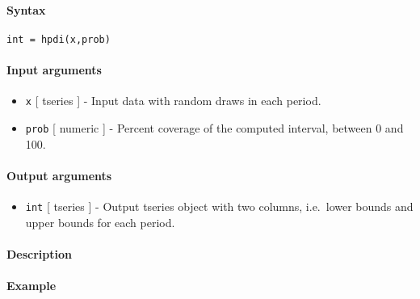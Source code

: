 


	\paragraph{Syntax}

\begin{verbatim}
int = hpdi(x,prob)
\end{verbatim}

\paragraph{Input arguments}

\begin{itemize}
\item
  \texttt{x} {[} tseries {]} - Input data with random draws in each
  period.
\item
  \texttt{prob} {[} numeric {]} - Percent coverage of the computed
  interval, between 0 and 100.
\end{itemize}

\paragraph{Output arguments}

\begin{itemize}
\itemsep1pt\parskip0pt
\item
  \texttt{int} {[} tseries {]} - Output tseries object with two columns,
  i.e.~lower bounds and upper bounds for each period.
\end{itemize}

\paragraph{Description}

\paragraph{Example}


